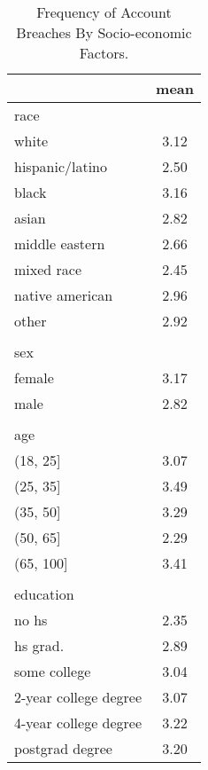 \documentclass[12pt, letterpaper]{article}
\begin{document}
\begin{table}[h!]
\centering
\caption{Frequency of Account Breaches By Socio-economic Factors.}
\begin{tabular}{ l c }
\hline    
 & mean \\
\hline
race   & \\
\hspace{2mm}white            &  3.12\\
\hspace{2mm}hispanic/latino  &  2.50\\
\hspace{2mm}black            &  3.16\\
\hspace{2mm}asian            &  2.82\\
\hspace{2mm}middle eastern   &  2.66\\
\hspace{2mm}mixed race       &  2.45\\
\hspace{2mm}native american  &  2.96\\
\hspace{2mm}other            &  2.92\\
& \\
sex & \\
\hspace{2mm}female          &  3.17\\
\hspace{2mm}male            &  2.82\\
& \\
age & \\
\hspace{2mm}(18, 25]     & 3.07 \\
\hspace{2mm}(25, 35]     & 3.49\\
\hspace{2mm}(35, 50]     & 3.29\\
\hspace{2mm}(50, 65]     & 2.29 \\
\hspace{2mm}(65, 100]    & 3.41 \\
& \\
education & \\
\hspace{2mm}no hs                 &   2.35\\
\hspace{2mm}hs grad.              &   2.89\\
\hspace{2mm}some college          &   3.04\\
\hspace{2mm}2-year college degree &   3.07\\
\hspace{2mm}4-year college degree &   3.22\\
\hspace{2mm}postgrad degree       &   3.20\\
\hline
\end{tabular}
\label{table:socdem_dat}
\end{table}
\end{document}
